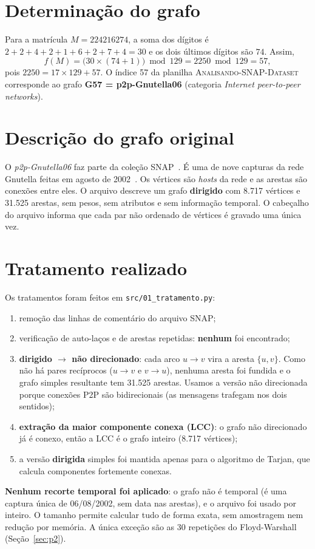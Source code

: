 \documentclass[sigconf]{webmedia}
\begin{document}
\section{Determinação do grafo}
Para a matrícula $M = 224216274$, a soma dos dígitos é
$2+2+4+2+1+6+2+7+4 = 30$ e os dois últimos dígitos são $74$. Assim,
\[
f(M) = \big(30 \times (74+1)\big) \bmod 129 = 2250 \bmod 129 = 57,
\]
pois $2250 = 17 \times 129 + 57$. O índice 57 da planilha
\textsc{Analisando-SNAP-Dataset} corresponde ao grafo \textbf{G57 = p2p-Gnutella06}
(categoria \textit{Internet peer-to-peer networks}).

\section{Descrição do grafo original}
O \textit{p2p-Gnutella06} faz parte da coleção SNAP~\cite{snapnets}. É uma de nove
capturas da rede Gnutella feitas em agosto de 2002~\cite{leskovec2007,ripeanu2002}.
Os vértices são \textit{hosts} da rede e as arestas são conexões entre eles. O
arquivo descreve um grafo \textbf{dirigido} com 8.717 vértices e 31.525 arestas, sem
pesos, sem atributos e sem informação temporal. O cabeçalho do arquivo informa que
cada par não ordenado de vértices é gravado uma única vez.

\section{Tratamento realizado}\label{sec:tratamento}
Os tratamentos foram feitos em \texttt{src/01\_tratamento.py}:
\begin{enumerate}
  \item remoção das linhas de comentário do arquivo SNAP;
  \item verificação de auto-laços e de arestas repetidas: \textbf{nenhum} foi encontrado;
  \item \textbf{dirigido $\rightarrow$ não direcionado}: cada arco $u\rightarrow v$
  vira a aresta $\{u,v\}$. Como não há pares recíprocos ($u\rightarrow v$ e
  $v\rightarrow u$), nenhuma aresta foi fundida e o grafo simples resultante tem
  31.525 arestas. Usamos a versão não direcionada porque conexões P2P são
  bidirecionais (as mensagens trafegam nos dois sentidos);
  \item \textbf{extração da maior componente conexa (LCC)}: o grafo não direcionado
  já é conexo, então a LCC é o grafo inteiro (8.717 vértices);
  \item a versão \textbf{dirigida} simples foi mantida apenas para o algoritmo de
  Tarjan, que calcula componentes fortemente conexas.
\end{enumerate}
\textbf{Nenhum recorte temporal foi aplicado}: o grafo não é temporal (é uma captura
única de 06/08/2002, sem data nas arestas), e o arquivo foi usado por inteiro.
O tamanho permite calcular tudo de forma exata, sem amostragem nem redução por memória.
A única exceção são as 30 repetições do Floyd-Warshall (Seção~\ref{sec:p2}).
\end{document}
